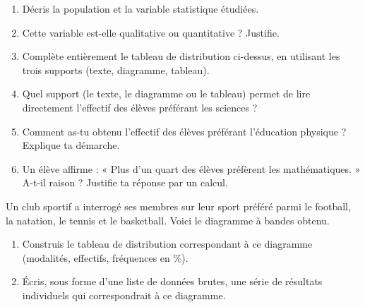 \documentclass[../../syllabus_1.tex]{subfiles}
\begin{document}
\begin{exercise}
    \begin{enumerate}[itemsep=1.5cm]
        \item Décris la population et la variable statistique étudiées.
        \item Cette variable est-elle qualitative ou quantitative ? Justifie.
        \item Complète entièrement le tableau de distribution ci-dessus, en utilisant les trois supports (texte, diagramme, tableau).
        \item Quel support (le texte, le diagramme ou le tableau) permet de lire directement l'effectif des élèves préférant les sciences ?
        \item Comment as-tu obtenu l'effectif des élèves préférant l'éducation physique ? Explique ta démarche.
        \item Un élève affirme : « Plus d'un quart des élèves préfèrent les mathématiques. » A-t-il raison ? Justifie ta réponse par un calcul.
    \end{enumerate}
\end{exercise}

\newpage

\begin{exercise}
    Un club sportif a interrogé ses membres sur leur sport préféré parmi le football, la natation, le tennis et le basketball. Voici le diagramme à bandes obtenu.
    \begin{center}
    \end{center}
    \begin{enumerate}[itemsep=6cm]
        \item Construis le tableau de distribution correspondant à ce diagramme (modalités, effectifs, fréquences en \%).
        \item Écris, sous forme d'une liste de données brutes, une série de résultats individuels qui correspondrait à ce diagramme.
    \end{enumerate}
\end{exercise}
\end{document}

